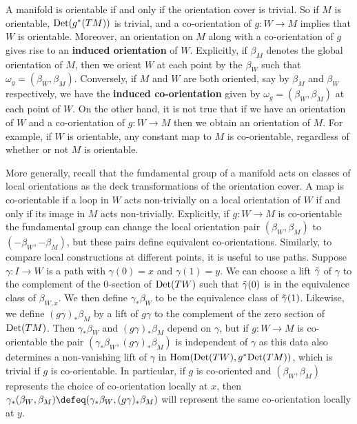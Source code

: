 A manifold is orientable if and only if the orientation cover is trivial.
So if $M$ is orientable, ${\rm Det}(g^*(TM))$ is trivial, and a co-orientation of $g \colon W \to M$ implies that $W$ is orientable.
Moreover, an orientation on $M$ along with a co-orientation of $g$ gives rise to an \textbf{induced orientation} of $W$.
Explicitly, if $\beta_M$ denotes the global orientation of $M$, then we orient $W$ at each point by the $\beta_W$ such that $\omega_g = (\beta_W,\beta_M)$.
Conversely, if $M$ and $W$ are both oriented, say by $\beta_M$ and $\beta_W$ respectively, we have the \textbf{induced co-orientation} given by $\omega_g = (\beta_W,\beta_M)$ at each point of $W$.
On the other hand, it is not true that if we have an orientation of $W$ and a co-orientation of $g \colon W \to M$ then we obtain an orientation of $M$.
For example, if $W$ is orientable, any constant map to $M$ is co-orientable, regardless of whether or not $M$ is orientable.

More generally, recall that the fundamental group of a manifold acts on classes of local orientations as the deck transformations of the orientation cover.
A map is co-orientable if a loop in $W$ acts non-trivially on a local orientation of $W$ if and only if
its image in $M$ acts non-trivially.
Explicitly, if $g \colon W \to M$ is co-orientable the fundamental group can change the local orientation pair
$(\beta_W, \beta_M)$ to $(-\beta_W, -\beta_M)$, but these pairs define equivalent co-orientations.
Similarly, to compare local constructions at different points, it is useful to use paths.
Suppose $\gamma \colon I \to W$ is a path with $\gamma(0) = x$ and $\gamma(1) = y$.
We can choose a lift $\tilde \gamma$ of $\gamma$ to the complement of the $0$-section of ${\rm Det}(TW)$ such that $\tilde \gamma(0)$ is in the equivalence class of $\beta_{W,x}$.
We then define $\gamma_*\beta_{W}$ to be the equivalence class of $\tilde \gamma(1)$.
Likewise, we define $(g\gamma)_*\beta_M$ by a lift of $g\gamma$ to the complement of the zero section of ${\rm Det}(TM)$.
Then $\gamma_*\beta_{W}$ and $(g\gamma)_*\beta_M$ depend on $\gamma$, but if $g \colon W \to M$ is co-orientable the pair $(\gamma_*\beta_{W}, (g\gamma)_*\beta_M)$ is independent of $\gamma$ as this data also determines a non-vanishing lift of $\gamma$ in $\textup{Hom}({\rm Det}(TW),g^*{\rm Det}(TM))$, which is trivial if $g$ is co-orientable.
In particular, if $g$ is co-oriented and $(\beta_{W}, \beta_M)$ represents the choice of co-orientation locally at $x$, then $\gamma_*(\beta_W,\beta_M) \defeq (\gamma_*\beta_{W}, (g\gamma)_*\beta_M)$ will represent the same co-orientation locally at $y$.

